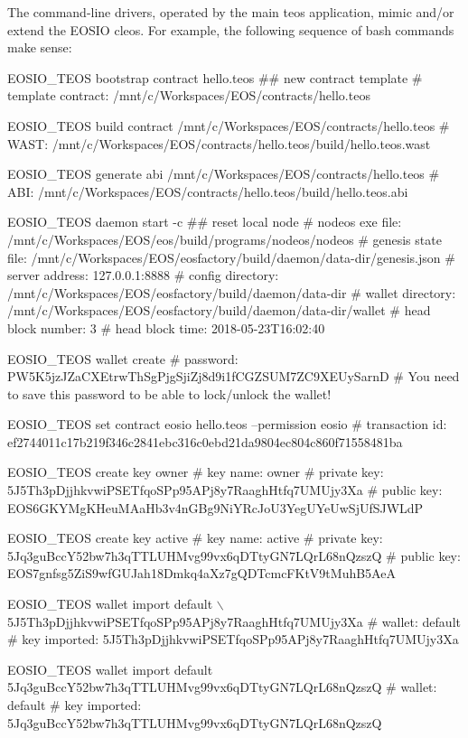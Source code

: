 The command-\/line drivers, operated by the main {\ttfamily teos} application, mimic and/or extend the E\+O\+S\+IO {\ttfamily cleos}. For example, the following sequence of bash commands make sense\+: 
\begin{DoxyCode}
$ $EOSIO\_TEOS bootstrap contract hello.teos     ## new contract template
#  template contract: /mnt/c/Workspaces/EOS/contracts/hello.teos

$ $EOSIO\_TEOS build contract /mnt/c/Workspaces/EOS/contracts/hello.teos
#  WAST: /mnt/c/Workspaces/EOS/contracts/hello.teos/build/hello.teos.wast

$ $EOSIO\_TEOS generate abi /mnt/c/Workspaces/EOS/contracts/hello.teos
#  ABI: /mnt/c/Workspaces/EOS/contracts/hello.teos/build/hello.teos.abi

$ $EOSIO\_TEOS daemon start -c                   ## reset local node
#  nodeos exe file: /mnt/c/Workspaces/EOS/eos/build/programs/nodeos/nodeos
#  genesis state file: 
  /mnt/c/Workspaces/EOS/eosfactory/build/daemon/data-dir/genesis.json
#   server address: 127.0.0.1:8888
#  config directory: /mnt/c/Workspaces/EOS/eosfactory/build/daemon/data-dir
#  wallet directory: /mnt/c/Workspaces/EOS/eosfactory/build/daemon/data-dir/wallet
#  head block number: 3
#  head block time: 2018-05-23T16:02:40

$ $EOSIO\_TEOS wallet create
#         password: PW5K5jzJZaCXEtrwThSgPjgSjiZj8d9i1fCGZSUM7ZC9XEUySarnD
#  You need to save this password to be able to lock/unlock the wallet!

$ $EOSIO\_TEOS set contract eosio hello.teos --permission eosio
#   transaction id: 
  ef2744011c17b219f346c2841ebc316c0ebd21da9804ec804c860f71558481ba

$ $EOSIO\_TEOS create key owner
#         key name: owner
#      private key: 5J5Th3pDjjhkvwiPSETfqoSPp95APj8y7RaaghHtfq7UMUjy3Xa
#       public key: EOS6GKYMgKHeuMAaHb3v4nGBg9NiYRcJoU3YegUYeUwSjUfSJWLdP

$ $EOSIO\_TEOS create key active
#         key name: active
#      private key: 5Jq3guBccY52bw7h3qTTLUHMvg99vx6qDTtyGN7LQrL68nQzszQ
#       public key: EOS7gnfsg5ZiS9wfGUJah18Dmkq4aXz7gQDTcmcFKtV9tMuhB5AeA

$ $EOSIO\_TEOS wallet import default \(\backslash\)
  5J5Th3pDjjhkvwiPSETfqoSPp95APj8y7RaaghHtfq7UMUjy3Xa
#           wallet: default
#     key imported: 5J5Th3pDjjhkvwiPSETfqoSPp95APj8y7RaaghHtfq7UMUjy3Xa

$ $EOSIO\_TEOS wallet import default 
  5Jq3guBccY52bw7h3qTTLUHMvg99vx6qDTtyGN7LQrL68nQzszQ
#           wallet: default
#     key imported: 5Jq3guBccY52bw7h3qTTLUHMvg99vx6qDTtyGN7LQrL68nQzszQ


\end{DoxyCode}
